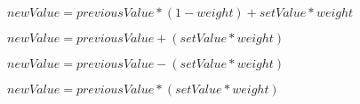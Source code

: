 \documentclass{article}
\begin{document}
$newValue = previousValue * (1 - weight) + setValue * weight$
\pagebreak

$newValue = previousValue + (setValue * weight)$
\pagebreak

$newValue = previousValue - (setValue * weight)$
\pagebreak

$newValue = previousValue * (setValue * weight)$
\pagebreak
\end{document}
